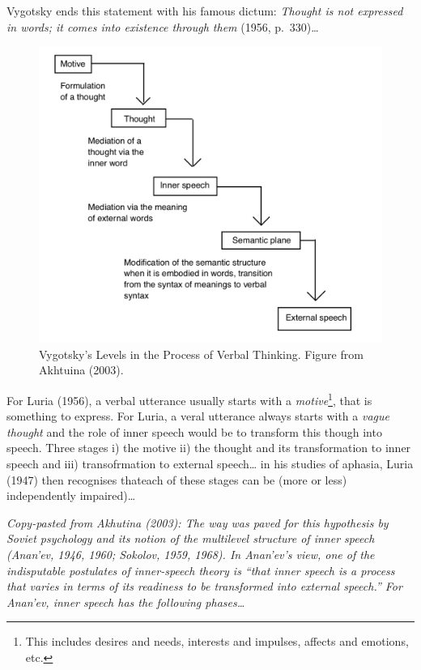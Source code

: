 \documentclass[a4paper,12pt,twoside,openright,oldfontcommands]{memoir}
\let\rmarkdownfootnote\footnote%
\def\footnote{\protect\rmarkdownfootnote}
\begin{document}
Vygotsky ends this statement with his famous dictum: \emph{Thought is not expressed in words; it comes into existence through them} (1956, p.~330)\ldots{}

\begin{figure}

{\centering \includegraphics[width=0.75\linewidth]{assets/vygotsky} 

}

\caption{Vygotsky’s Levels in the Process of Verbal Thinking. Figure from Akhtuina (2003).}\label{fig:vygotsky}
\end{figure}

For Luria (1956), a verbal utterance usually starts with a \emph{motive}\footnote{This includes desires and needs, interests and impulses, affects and emotions, etc.}, that is something to express. For Luria, a veral utterance always starts with a \emph{vague thought} and the role of inner speech would be to transform this though into speech. Three stages i) the motive ii) the thought and its transformation to inner speech and iii) transofrmation to external speech\ldots{} in his studies of aphasia, Luria (1947) then recognises thateach of these stages can be (more or less) independently impaired)\ldots{}

\emph{Copy-pasted from Akhutina (2003): The way was paved for this hypothesis by Soviet psychology and its notion of the multilevel structure of inner speech (Anan'ev, 1946, 1960; Sokolov, 1959, 1968). In Anan'ev's view, one of the indisputable postulates of inner-speech theory is \enquote{that inner speech is a process that varies in terms of its readiness to be transformed into external speech.} For Anan'ev, inner speech has the following phases\ldots{}}
\end{document}
